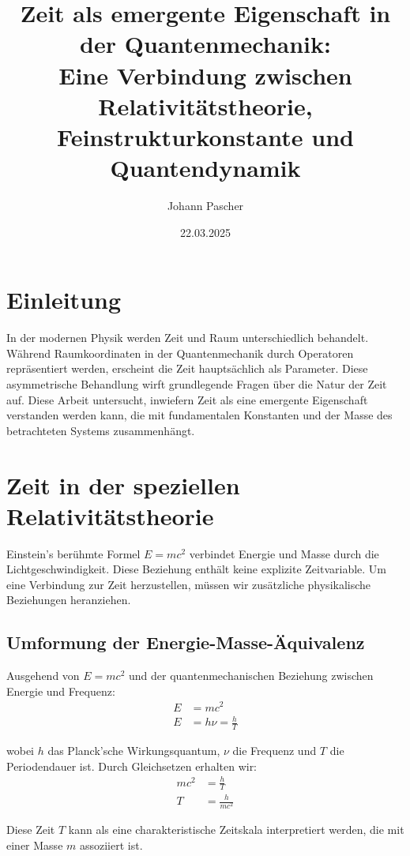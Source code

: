 \documentclass{article}
\title{Zeit als emergente Eigenschaft in der Quantenmechanik: \\Eine Verbindung zwischen Relativitätstheorie, Feinstrukturkonstante und Quantendynamik}
\author{Johann Pascher}
\date{22.03.2025}
\begin{document}
	
	\maketitle
	
	\tableofcontents
	
	\section{Einleitung}
	
	In der modernen Physik werden Zeit und Raum unterschiedlich behandelt. Während Raumkoordinaten in der Quantenmechanik durch Operatoren repräsentiert werden, erscheint die Zeit hauptsächlich als Parameter. Diese asymmetrische Behandlung wirft grundlegende Fragen über die Natur der Zeit auf. Diese Arbeit untersucht, inwiefern Zeit als eine emergente Eigenschaft verstanden werden kann, die mit fundamentalen Konstanten und der Masse des betrachteten Systems zusammenhängt.
	
	\section{Zeit in der speziellen Relativitätstheorie}
	
	Einstein's berühmte Formel $E = mc^2$ verbindet Energie und Masse durch die Lichtgeschwindigkeit. Diese Beziehung enthält keine explizite Zeitvariable. Um eine Verbindung zur Zeit herzustellen, müssen wir zusätzliche physikalische Beziehungen heranziehen.
	
	\subsection{Umformung der Energie-Masse-Äquivalenz}
	
	Ausgehend von $E = mc^2$ und der quantenmechanischen Beziehung zwischen Energie und Frequenz:
	\begin{align}
		E &= mc^2 \\
		E &= h\nu = \frac{h}{T}
	\end{align}
	
	wobei $h$ das Planck’sche Wirkungsquantum, $\nu$ die Frequenz und $T$ die Periodendauer ist. Durch Gleichsetzen erhalten wir:
	\begin{align}
		mc^2 &= \frac{h}{T} \\
		T &= \frac{h}{mc^2}
	\end{align}
	
	Diese Zeit $T$ kann als eine charakteristische Zeitskala interpretiert werden, die mit einer Masse $m$ assoziiert ist.
	
\end{document}
